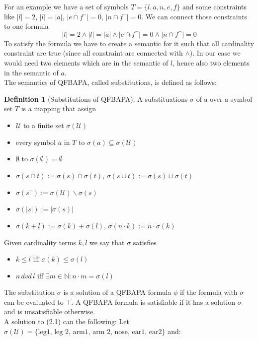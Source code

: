 \documentclass{book}
\theoremstyle{break}
\theoremstyle{definition}
\newtheorem{mydef}{Definition}
\begin{document}
For an example we have a set of symbols $T=\{l, a, n, e, f\}$ and some constraints like $|l|=2$, $|l|=|a|$, $|e\cap f^\neg|=0$, $|n\cap f^\neg|=0$. We can connect those constraints to one formula 
\begin{equation}
|l|=2\wedge|l|=|a|\wedge |e\cap f^\neg|=0\wedge |n\cap f^\neg|=0
\end{equation}
To satisfy the formula we have to create a semantic for it such that all cardinality constraint are true (since all constraint are connected with $\wedge$). In our case we would need two elements which are in the semantic of $l$, hence also two elements in the semantic of $a$.\\
The semantics of QFBAPA, called substitutions, is defined as follows:
\begin{mydef}[Substitutions of QFBAPA]
A substituations $\sigma$ of a over a symbol set $T$ is a mapping that assign
\begin{itemize}
\item $\mathcal{U}$ to a finite set $\sigma(\mathcal{U})$
\item every symbol $a$ in $T$ to $\sigma(a)\subseteq\sigma(\mathcal{U})$
\item $\emptyset$ to $\sigma(\emptyset)=\emptyset$
\item $\sigma(s\cap t):= \sigma(s)\cap \sigma(t)$, $\sigma(s\cup t):= \sigma(s)\cup \sigma(t)$
\item $\sigma(s^\neg):=\sigma(\mathcal{U})\backslash \sigma(s)$
\item $\sigma(|s|):=|\sigma(s)|$
\item $\sigma(k+l):=\sigma(k)+\sigma(l)$, $\sigma(n\cdot k):= n\cdot \sigma(k)$
\end{itemize}
Given cardinality terms $k,l$ we say that $\sigma$ satisfies
\begin{itemize}
\item $k\leq l$ iff $\sigma(k)\leq \sigma(l)$
\item $n\,dvd\,l$ iff $\exists m\in\mathbb{N}:n\cdot m = \sigma(l)$
\end{itemize}
\end{mydef}
The substitution $\sigma$ is a solution of a QFBAPA formula $\phi$ if the formula with $\sigma$ can be evaluated to $\top$. A QFBAPA formula is satisfiable if it has a solution $\sigma$ and is unsatisfiable otherwise.\\
A solution to (2.1) can the following: Let $\sigma(\mathcal{U})=\{\text{leg1, leg 2, arm1, arm 2, nose, ear1, ear2}\}$ and:
\end{document}
